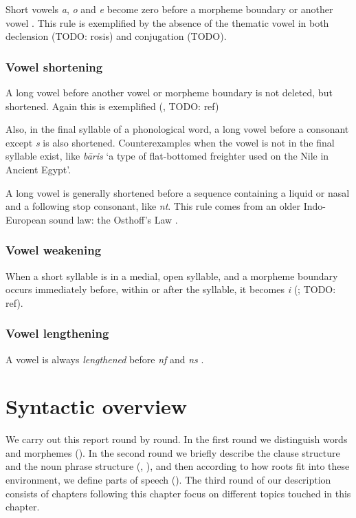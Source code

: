 \documentclass[a4paper, oneside, 12pt]{report}
\newcommand*{\citesec}[1]{\S~{#1}}
\newcommand*{\citepage}[1]{p.~{#1}}
\newcommand{\form}[1]{\emph{#1}}
\newcommand{\translate}[1]{`#1'}
\begin{document}
Short vowels \form{a}, \form{o} and \form{e} 
become zero before a morpheme boundary or another vowel
\citep[\citesec{8.3}]{oniga2014latin}.
This rule is exemplified by the absence 
of the thematic vowel in both declension (TODO: rosis)
and conjugation (TODO).

\subsection{Vowel shortening}\label{sec:phonology.rule.shortening}

A long vowel before another vowel or morpheme boundary 
is not deleted, but shortened.
Again this is exemplified (, TODO: ref)

Also, in the final syllable of a phonological word,
a long vowel before a consonant except \form{s} is also shortened.
Counterexamples when the vowel is not in the final syllable exist,
like \form{b\={a}ris} \translate{a type of flat-bottomed freighter used on the Nile in Ancient Egypt}.

A long vowel is generally shortened before a sequence 
containing a liquid or nasal and a following stop consonant,
like \form{nt}.
This rule comes from an older Indo-European sound law: 
the Osthoff's Law
\citep[\citepage{55}]{oniga2014latin}.

\subsection{Vowel weakening}

When a short syllable is in a medial, open syllable,
and a morpheme boundary occurs immediately before, within or after the syllable,
it becomes \form{i} 
(\citealt[\citepage{55}]{oniga2014latin}; TODO: ref).

\subsection{Vowel lengthening}

A vowel is always \emph{lengthened} before \form{nf} and \form{ns}
\citep[\citepage{55}]{oniga2014latin}.

\chapter{Syntactic overview}

We carry out this report round by round.
In the first round we distinguish words and morphemes
().
In the second round we briefly describe the clause structure and the noun phrase structure
(, ),
and then according to how roots fit into these environment,
we define parts of speech (). 
The third round of our description
consists of chapters following this chapter focus on different topics touched in this chapter.
\end{document}
